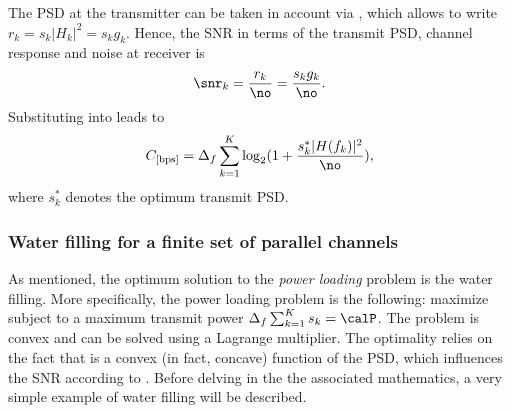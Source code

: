 The PSD at the transmitter can be taken in account via , which allows to write
$r_k = s_k |H_k|^2 = s_k g_k$. Hence, the SNR in terms of the transmit PSD, channel response and noise at receiver is
\begin{equation}
\snr_k = \frac{r_k}{\no} = \frac{s_k g_k}{\no}.
\label{eq:snr_multicarrierFinal}
\end{equation}
Substituting  into  leads to
\begin{equation}
C_{[\textrm{bps}]} = \Delta_f \sum_{k=1}^K \log_2 (1 + \frac{s_k^* |H(f_k)|^2}{\no}),
\label{eq:totalCapacityInbpsComplete}
\end{equation}
where $s_k^*$ denotes the optimum transmit PSD.


\subsubsection{Water filling for a finite set of parallel channels}

As mentioned, the optimum solution to the \emph{power loading} problem is the water filling. More specifically, the power loading problem is the following: maximize  subject to a maximum transmit power $\Delta_f \sum_{k=1}^K s_k = \calP$. The problem is convex and can be solved using a Lagrange multiplier. The optimality relies on the fact that 
 is a convex (in fact, concave) function of the PSD, which influences the SNR according to . 
Before delving in the the associated mathematics, a very simple example of water filling will be described.

